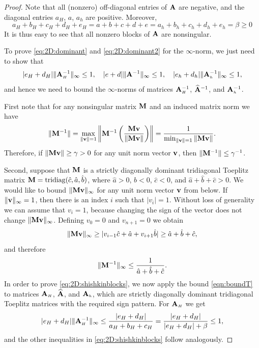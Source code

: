 \begin{proof}
Note that all (nonzero) off-diagonal entries of $\mathbf{A}$ are negative,
and the diagonal entries $a_H$, $a$, $a_h$ are positive. Moreover,
\[
a_H + b_H + c_H + d_H + e_H
= a + b + c + d + e
= a_h + b_h + c_h + d_h + e_h = \beta \geq 0
\]
It is thus easy to see that all nonzero blocks of $\mathbf{A}$ are nonsingular.

To prove \eqref{eq:2D:dominant} and \eqref{eq:2D:dominant2} for the
$\infty$-norm, we just need to show that
\begin{equation}\label{eq:2D:shishkinblocks}
 |e_H+d_H| \|\mathbf{A}_{\scriptscriptstyle H}^{-1}\|_\infty \leq 1,\quad
|e+d| \|\mathbf{A}^{-1}\|_\infty \leq 1,\quad
|e_h+d_h| \|\mathbf{A}_{\scriptscriptstyle h}^{-1}\|_\infty \leq 1,
\end{equation}
and hence we need to bound the $\infty$-norms of matrices
$\mathbf{A}_{\scriptscriptstyle H}^{-1}$, $\widehat{\mathbf{A}}^{-1}$, and $\mathbf{A}_{\scriptscriptstyle h}^{-1}$.

First note that for any nonsingular matrix $\mathbf{M}$ and an
induced matrix norm we have
\[
\|\mathbf{M}^{-1}\|=\max_{\|\mathbf{v}\|=1}\left\Vert \mathbf{M}^{-1}\left(\frac{\mathbf{M}\mathbf{v}}{\|\mathbf{M}\mathbf{v}\|}\right)\right\Vert =\frac{1}{\min_{\|\mathbf{v}\|=1}\|\mathbf{M} \mathbf{v}\|}.
\]
Therefore, if $\|\mathbf{M} \mathbf{v}\|\geq\gamma>0$ for any unit norm vector $\mathbf{v}$,
then $\|\mathbf{M}^{-1}\|\leq{\gamma^{-1}}$.


Second, suppose that $\mathbf{M}$ is a strictly diagonally dominant
tridiagonal Toeplitz matrix
$\mathbf{M}=\mathrm{tridiag}(\hat{c},\hat{a},\hat{b})$,
where $\hat{a}>0$, $\hat{b}<0$, $\hat{c}<0$, and
$
\hat{a}+\hat{b}+\hat{c}>0.
$
We would like to bound $\|\mathbf{M} \mathbf{v}\|_{\infty}$ for any unit norm vector $\mathbf{v}$
from below. If $\|\mathbf{v}\|_{\infty}=1$, then there is an index $i$ such that
$|v_{i}|=1$. Without loss of generality we can assume that $v_{i}=1$, because
changing the sign of the vector does not change $\|\mathbf{M} \mathbf{v}\|_{\infty}$.
Defining $v_{0}=0$ and $v_{n+1}=0$ we obtain
\[
\|\mathbf{M} \mathbf{v}\|_{\infty}\geq|v_{i-1}\hat{c}+\hat{a}+v_{i+1}\hat{b}|\geq \hat{a}+\hat{b}+\hat{c},
\]
and therefore
\begin{equation}\label{eqn:boundT}
\|\mathbf{M}^{-1}\|_{\infty}\leq\frac{1}{\hat{a}+\hat{b}+\hat{c}}.
\end{equation}
%
In order to prove \eqref{eq:2D:shishkinblocks}, we now apply the bound
\eqref{eqn:boundT} to matrices $\mathbf{A}_{\scriptscriptstyle H}$, $\widehat{\mathbf{A}}$, and $\mathbf{A}_{\scriptscriptstyle h}$, which are
strictly diagonally dominant tridiagonal Toeplitz matrices with the required
sign pattern. For $\mathbf{A}_{\scriptscriptstyle H}$ we get
\[
    |e_H + d_H| \|\mathbf{A}_{\scriptscriptstyle H}^{-1}\|_\infty \leq \frac{|e_H + d_H|}{a_H+b_H+c_H}
    = \frac{|e_H + d_H|}{|e_H + d_H| + \beta} \leq 1,
\]
and the other inequalities in \eqref{eq:2D:shishkinblocks} follow analogously.
%
\end{proof}

